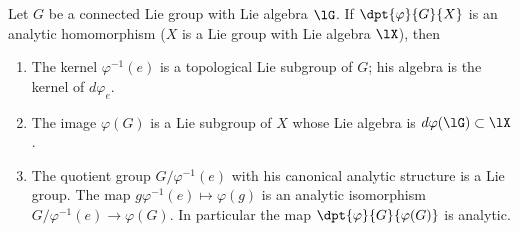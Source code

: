 \begin{lemma}\label{lem:vp_G_X}
    Let $G$ be a connected Lie group with Lie algebra $\lG$. If $\dpt{\varphi}{G}{X}$ is an analytic homomorphism ($X$ is a Lie group with Lie algebra $\lX$), then

    \begin{enumerate}
    \item The kernel $\varphi^{-1}(e)$ is a topological Lie subgroup of $G$; his algebra is the kernel of $d\varphi_e$.
    \item The image $\varphi(G)$ is a Lie subgroup of $X$ whose Lie algebra is $d\varphi(\lG)\subset\lX$.
    \item The quotient group $G/\varphi^{-1}(e)$ with his canonical analytic structure is a Lie group. The map $g\varphi^{-1}(e)\mapsto\varphi(g)$ is an analytic isomorphism $G/\varphi^{-1}(e)\to\varphi(G)$. In particular the map $\dpt{\varphi}{G}{\varphi(G)}$ is analytic.
    \end{enumerate}
\end{lemma}

